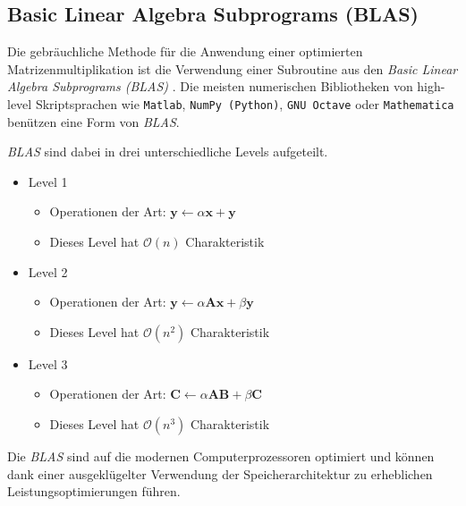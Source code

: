 \subsection{Basic Linear Algebra Subprograms (BLAS)}
%
%
Die gebräuchliche Methode f\"ur die Anwendung einer optimierten Matrizenmultiplikation ist die Verwendung einer Subroutine aus den \textit{Basic Linear Algebra Subprograms (BLAS)}  \cite{multiplikation:BLAS}.
Die meisten numerischen Bibliotheken von high-level Skriptsprachen wie \texttt{Matlab}, \texttt{NumPy (Python)}, \texttt{GNU Octave} oder \texttt{Mathematica} ben\"utzen eine Form von \textit{BLAS}.
%
%
%
%

\textit{BLAS} sind dabei in drei unterschiedliche Levels aufgeteilt.

\begin{itemize}
	\item Level 1
	\begin{itemize}
		\item Operationen der Art: $\mathbf{y} \leftarrow \alpha \mathbf{x}+\mathbf{y}$
		\item Dieses Level hat $\mathcal{O}(n)$ Charakteristik
	\end{itemize}
	\item Level 2
	\begin{itemize}
		\item Operationen der Art: $\mathbf{y} \leftarrow \alpha \mathbf{A}\mathbf{x}+\beta  \mathbf{y}$
		\item Dieses Level hat $\mathcal{O}(n^2)$ Charakteristik
		\end{itemize}
		\item Level 3
		\begin{itemize}
			\item Operationen der Art: $\mathbf{C} \leftarrow \alpha \mathbf{A}\mathbf{B}+\beta\mathbf{C}$
			\item Dieses Level hat $\mathcal{O}(n^3)$ Charakteristik
			\end{itemize}
\end{itemize}

Die \textit{BLAS} sind auf die modernen Computerprozessoren optimiert und k\"onnen dank einer ausgeklügelter Verwendung der Speicherarchitektur zu erheblichen Leistungsoptimierungen f\"uhren.


%
%

